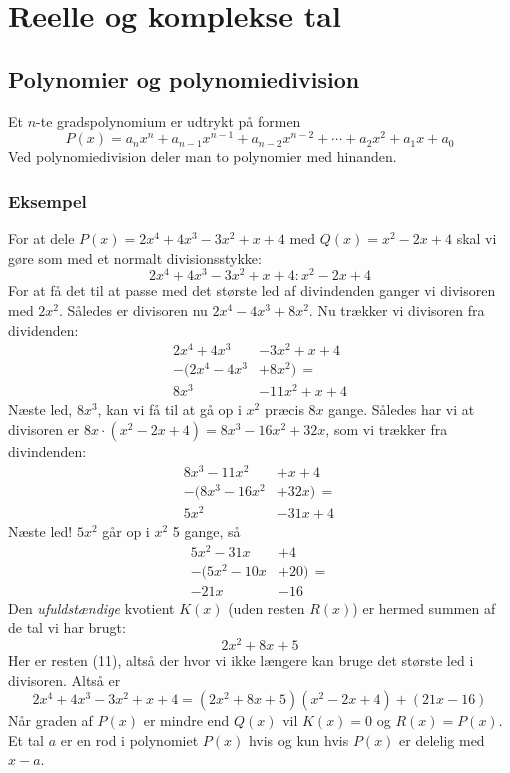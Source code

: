 \chapter{Reelle og komplekse tal}
\section{Polynomier og polynomiedivision}
Et $n$-te gradspolynomium er udtrykt på formen\begin{equation}
    P(x)=a_nx^n+a_{n-1}x^{n-1}+a_{n-2}x^{n-2}+\cdots+a_2x^2+a_1x+a_0
\end{equation}Ved polynomiedivision deler man to polynomier med hinanden. \subsection{Eksempel}For at dele $P(x)=2x^4+4x^3-3x^2+x+4$ med $Q(x)=x^2-2x+4$ skal vi gøre som med et normalt divisionsstykke:\begin{equation}
    2x^4+4x^3-3x^2+x+4 : x^2-2x+4
\end{equation}For at få det til at passe med det største led af divindenden ganger vi divisoren med $2x^2$. Således er divisoren nu $2x^4-4x^3+8x^2$. Nu trækker vi divisoren fra dividenden:\begin{align}
    2x^4+4x^3&-3x^2+x+4\\
    -(2x^4-4x^3&+8x^2)\,=\\
    8x^3&-11x^2+x+4
\end{align}
Næste led, $8x^3$, kan vi få til at gå op i $x^2$ præcis $8x$ gange. Således har vi at divisoren er $8x\cdot(x^2-2x+4)=8x^3-16x^2+32x$, som vi trækker fra divindenden:\begin{align}
    8x^3-11x^2&+x+4\\
    -(8x^3-16x^2&+32x)\,=\\
    5x^2&-31x+4
\end{align}
Næste led! $5x^2$ går op i $x^2$ 5 gange, så
\begin{align}
    5x^2-31x&+4\\
    -(5x^2-10x&+20)\,=\\
    -21x&-16
\end{align}
Den \textit{ufuldstændige} kvotient $K(x)$ (uden resten $R(x)$) er hermed summen af de tal vi har brugt:$$2x^2+8x+5$$Her er resten (11), altså der hvor vi ikke længere kan bruge det største led i divisoren. Altså er \begin{equation}
    2x^4+4x^3-3x^2+x+4=(2x^2+8x+5)(x^2-2x+4)+(21x-16)
\end{equation}
Når graden af $P(x)$ er mindre end $Q(x)$ vil $K(x)=0$ og $R(x)=P(x)$.\\Et tal $a$ er en rod i polynomiet $P(x)$ hvis og kun hvis $P(x)$ er delelig med $x-a$.
